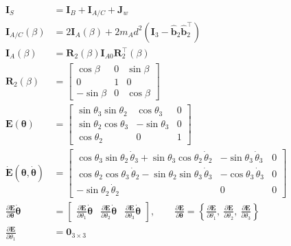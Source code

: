 \documentclass[titlepage]{article}
\begin{document}
\begin{mdframed}[linewidth=1pt, innertopmargin=10pt, innerbottommargin=10pt]
\begin{equation}
\begin{split}
			\boldsymbol{I}_S&=\boldsymbol{I}_B+\boldsymbol{I}_{A/C}+\boldsymbol{J}_w \\[6pt]
			\boldsymbol{I}_{A/C}(\beta)&=2\boldsymbol{I}_A(\beta)+2m_Ad^2\left(\boldsymbol{I}_3-\hat{\boldsymbol{b}}_2\hat{\boldsymbol{b}}_2^\top\right) \\[6pt]
			\boldsymbol{I}_A(\beta)&=\boldsymbol{R}_2(\beta)\boldsymbol{I}_{A0}\boldsymbol{R}_2^\top(\beta) \\[6pt]
			\boldsymbol{R}_2(\beta)&=
			\begin{bmatrix}
				\cos\beta & 0 & \sin\beta \\
				0 & 1 & 0 \\
				-\sin\beta & 0 & \cos\beta
			\end{bmatrix} \\[6pt]
			\boldsymbol{E}(\boldsymbol{\theta})&=
			\begin{bmatrix}
				\sin\theta_3\sin\theta_2 & \cos\theta_3 & 0 \\
				\sin\theta_2\cos\theta_3 & -\sin\theta_3 & 0 \\
				\cos\theta_2 & 0 & 1
			\end{bmatrix} \\[6pt]
			\dot{\boldsymbol{E}}(\boldsymbol{\theta},\dot{\boldsymbol{\theta}})&=
			\begin{bmatrix}
				\cos\theta_3\sin\theta_2\,\dot{\theta}_3+\sin\theta_3\cos\theta_2\,\dot{\theta}_2 & -\sin\theta_3\,\dot{\theta}_3 & 0 \\
				\cos\theta_2\cos\theta_3\,\dot{\theta}_2-\sin\theta_2\sin\theta_3\,\dot{\theta}_3 & -\cos\theta_3\,\dot{\theta}_3 & 0 \\
				-\sin\theta_2\,\dot{\theta}_2 & 0 & 0
			\end{bmatrix} \\[6pt]
			\frac{\partial\boldsymbol{E}}{\partial\boldsymbol{\theta}}\dot{\boldsymbol{\theta}}&=
			\begin{bmatrix}
				\frac{\partial\boldsymbol{E}}{\partial\theta_1}\dot{\boldsymbol{\theta}} & \frac{\partial\boldsymbol{E}}{\partial\theta_2}\dot{\boldsymbol{\theta}} & \frac{\partial\boldsymbol{E}}{\partial\theta_3}\dot{\boldsymbol{\theta}}
			\end{bmatrix},\qquad\frac{\partial\boldsymbol{E}}{\partial\boldsymbol{\theta}}=\left\{\frac{\partial\boldsymbol{E}}{\partial\theta_1},\ \frac{\partial\boldsymbol{E}}{\partial\theta_2},\ \frac{\partial\boldsymbol{E}}{\partial\theta_3}\right\} \\[6pt]
			\frac{\partial\boldsymbol{E}}{\partial\theta_1}&=\boldsymbol{0}_{3\times 3} \\[6pt]

\end{split}
\end{equation}
\end{mdframed}
\end{document}

